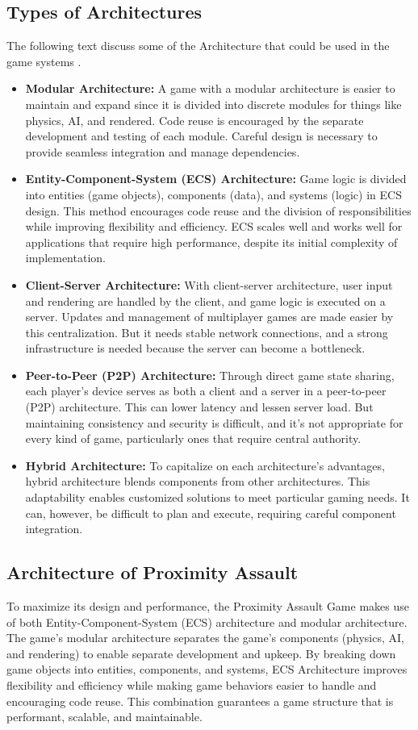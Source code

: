 \subsection{Types of Architectures}
The following text discuss some of the Architecture that could be used in the game systems \cite{unity_ecs}.
\begin{itemize}
	\item \textbf{Modular Architecture: }A game with a modular architecture is easier to maintain and expand since it is divided into discrete modules for things like physics, AI, and rendered. Code reuse is encouraged by the separate development and testing of each module. Careful design is necessary to provide seamless integration and manage dependencies.
	\item \textbf{Entity-Component-System (ECS) Architecture: }Game logic is divided into entities (game objects), components (data), and systems (logic) in ECS design. This method encourages code reuse and the division of responsibilities while improving flexibility and efficiency. ECS scales well and works well for applications that require high performance, despite its initial complexity of implementation.
	\item \textbf{Client-Server Architecture: }With client-server architecture, user input and rendering are handled by the client, and game logic is executed on a server. Updates and management of multiplayer games are made easier by this centralization. But it needs stable network connections, and a strong infrastructure is needed because the server can become a bottleneck.
	\item \textbf{Peer-to-Peer (P2P) Architecture: }Through direct game state sharing, each player's device serves as both a client and a server in a peer-to-peer (P2P) architecture. This can lower latency and lessen server load. But maintaining consistency and security is difficult, and it's not appropriate for every kind of game, particularly ones that require central authority. 
	\item \textbf{Hybrid Architecture: }To capitalize on each architecture's advantages, hybrid architecture blends components from other architectures. This adaptability enables customized solutions to meet particular gaming needs. It can, however, be difficult to plan and execute, requiring careful component integration.
\end{itemize}

\subsection{Architecture of Proximity Assault}
To maximize its design and performance, the Proximity Assault Game makes use of both Entity-Component-System (ECS) architecture and modular architecture. The game's modular architecture separates the game's components (physics, AI, and rendering) to enable separate development and upkeep. By breaking down game objects into entities, components, and systems, ECS Architecture improves flexibility and efficiency while making game behaviors easier to handle and encouraging code reuse. This combination guarantees a game structure that is performant, scalable, and maintainable.

